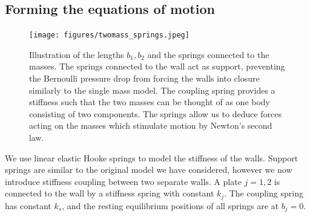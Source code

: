 \subsection{Forming the equations of motion}

\begin{figure}[h!]
    \centering
    \texttt{[image: figures/twomass\_springs.jpeg]}
    \caption
    {
        Illustration of the lengths $b_1,b_2$ and the springs connected to the masses.
        The springs connected to the wall act as support,
        preventing the Bernoulli pressure drop from forcing the walls into closure similarly to the single mass model.
        The coupling spring provides a stiffness such that the two masses can be thought of as one body consisting of two components.
        The springs allow us to deduce forces acting on the masses which stimulate motion by Newton's second law. 
    }
    \label{fig:twomass_springs}
\end{figure}

We use linear elastic Hooke springs to model the stiffness of the walls.
Support springs are similar to the original model we have considered,
however we now introduce stiffness coupling between two separate walls.
A plate $j = 1,2$ is connected to the wall by a stiffness spring with constant ${k}_j$.
The coupling spring has constant $k_s$, and the resting equilibrium positions of all springs are at $b_j = 0$.

